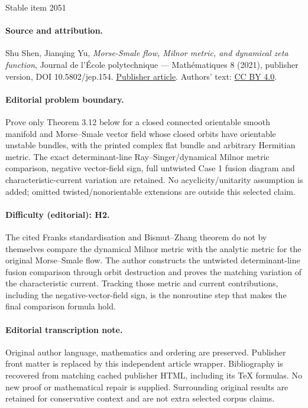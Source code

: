 \documentclass[11pt]{article}
\numberwithin{equation}{section}
\theoremstyle{plain}
\theoremstyle{definition}
\theoremstyle{remark}
\begin{document}
\begin{center}{\Large Stable item 2051}\end{center}
\paragraph{Source and attribution.}
Shu Shen, Jianqing Yu, \emph{Morse-Smale flow, Milnor metric, and dynamical zeta function}, Journal de l’École polytechnique — Mathématiques 8 (2021), publisher version, DOI 10.5802/jep.154. \href{https://jep.centre-mersenne.org/articles/10.5802/jep.154/}{Publisher article}. Authors' text: \href{https://creativecommons.org/licenses/by/4.0/}{CC BY 4.0}.
\paragraph{Editorial problem boundary.}
Prove only Theorem 3.12 below for a closed connected orientable smooth manifold and Morse--Smale vector field whose closed orbits have orientable unstable bundles, with the printed complex flat bundle and arbitrary Hermitian metric. The exact determinant-line Ray--Singer/dynamical Milnor metric comparison, negative vector-field sign, full untwisted Case 1 fusion diagram and characteristic-current variation are retained. No acyclicity/unitarity assumption is added; omitted twisted/nonorientable extensions are outside this selected claim.
\paragraph{Difficulty (editorial): H2.}
The cited Franks standardisation and Bismut--Zhang theorem do not by themselves compare the dynamical Milnor metric with the analytic metric for the original Morse--Smale flow. The author constructs the untwisted determinant-line fusion comparison through orbit destruction and proves the matching variation of the characteristic current. Tracking those metric and current contributions, including the negative-vector-field sign, is the nonroutine step that makes the final comparison formula hold.
\paragraph{Editorial transcription note.}
Original author language, mathematics and ordering are preserved. Publisher front matter is replaced by this independent article wrapper. Bibliography is recovered from matching cached publisher HTML, including its TeX formulas. No new proof or mathematical repair is supplied. Surrounding original results are retained for conservative context and are not extra selected corpus claims.
\clearpage
\end{document}
